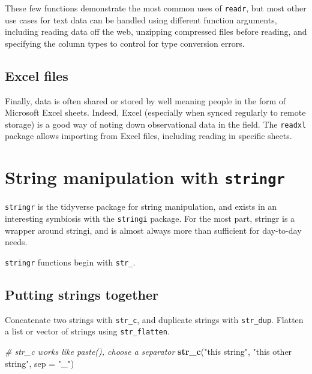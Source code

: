 \documentclass[
]{book}
\newenvironment{Shaded}{}{}
\newcommand{\CommentTok}[1]{\textcolor[rgb]{0.38,0.63,0.69}{\textit{#1}}}
\newcommand{\DataTypeTok}[1]{\textcolor[rgb]{0.56,0.13,0.00}{#1}}
\newcommand{\KeywordTok}[1]{\textcolor[rgb]{0.00,0.44,0.13}{\textbf{#1}}}
\newcommand{\NormalTok}[1]{#1}
\newcommand{\StringTok}[1]{\textcolor[rgb]{0.25,0.44,0.63}{#1}}
\begin{document}
These few functions demonstrate the most common uses of \texttt{readr}, but most other use cases for text data can be handled using different function arguments, including reading data off the web, unzipping
compressed files before reading, and specifying the column types to control for type conversion errors.

\hypertarget{excel-files}{%
\subsection*{Excel files}\label{excel-files}}

Finally, data is often shared or stored by well meaning people in the form of Microsoft Excel sheets. Indeed, Excel (especially when synced regularly to remote storage) is a good way of noting down observational data in the field. The \texttt{readxl} package allows importing from Excel files, including reading in specific sheets.

\hypertarget{string-manipulation-with-stringr}{%
\section{\texorpdfstring{String manipulation with \texttt{stringr}}{String manipulation with stringr}}\label{string-manipulation-with-stringr}}

\texttt{stringr} is the tidyverse package for string manipulation, and exists in an interesting symbiosis with the \texttt{stringi} package. For the most part, stringr is a wrapper around stringi, and is almost always more than sufficient for day-to-day needs.

\texttt{stringr} functions begin with \texttt{str\_}.

\hypertarget{putting-strings-together}{%
\subsection{Putting strings together}\label{putting-strings-together}}

Concatenate two strings with \texttt{str\_c}, and duplicate strings with \texttt{str\_dup}. Flatten a list or vector of strings using \texttt{str\_flatten}.

\begin{Shaded}
\begin{Highlighting}[]
\CommentTok{# str_c works like paste(), choose a separator}
\KeywordTok{str_c}\NormalTok{(}\StringTok{"this string"}\NormalTok{, }\StringTok{"this other string"}\NormalTok{, }\DataTypeTok{sep =} \StringTok{"_"}\NormalTok{)}
\end{Highlighting}
\end{Shaded}
\end{document}

